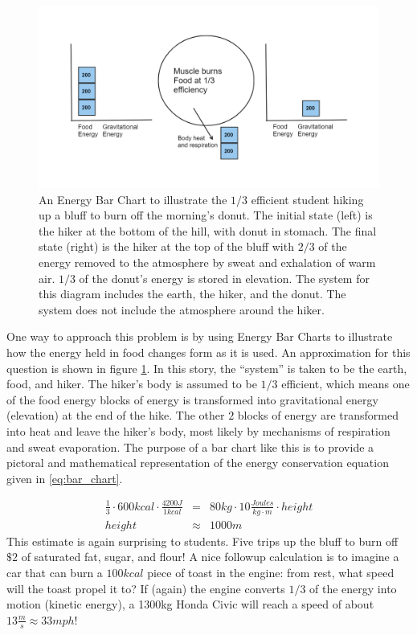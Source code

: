 \documentclass[12pt]{iopart}
\newcommand{\bea}{\begin{eqnarray}}
\newcommand{\eea}{\end{eqnarray}}
\begin{document}
\begin{figure}[h]
\centering
\includegraphics[width=\columnwidth]{bar_chart.png}
\caption{An Energy Bar Chart to illustrate the $1/3$ efficient student hiking up a bluff to burn off the morning's donut.  The initial state (left) is the hiker at the bottom of the hill, with donut in stomach.  The final state (right) is the hiker at the top of the bluff with $2/3$ of the energy removed to the atmosphere by sweat and exhalation of warm air. $1/3$ of the donut's energy is stored in elevation.  The system for this diagram includes the earth, the hiker, and the donut.  The system does not include the atmosphere around the hiker.  
}
\label{bar_chart}
\end{figure}

One way to approach this problem is by using Energy Bar Charts \cite{energy_bar_charts} to illustrate how the energy held in food changes form as it is used.  An approximation for this question is shown in figure \ref{bar_chart}.  
In this story, the ``system'' is taken to be the earth, food, and hiker.  The hiker's body is assumed to be $1/3$ efficient, which means one of the food energy blocks of energy is transformed into gravitational energy (elevation) at the end of the hike.  
The other $2$ blocks of energy are transformed into heat and leave the hiker's body, most likely by mechanisms of respiration and sweat evaporation. The purpose of a bar chart like this is to provide a pictoral and mathematical representation of the energy conservation equation given in \ref{eq:bar_chart}.         

\bea
\frac{1}{3}\cdot600kcal\cdot\frac{4200J}{1kcal} 
	&=& 80kg\cdot10\frac{Joules}{kg\cdot m}\cdot height \label{eq:bar_chart}\\
height &\approx&  1000 m
\eea
This estimate is again surprising to students.  Five trips up the bluff to burn off $\$2$ of saturated fat, sugar, and flour!  A nice followup calculation is to imagine a car that can burn a $100kcal$ piece of toast in the engine: from rest, what speed will the toast propel it to? If (again) the engine converts $1/3$ of the energy into motion (kinetic energy), a 1300kg Honda Civic will reach a speed of about $13\frac{m}{s}\approx33mph$!  
\end{document}
